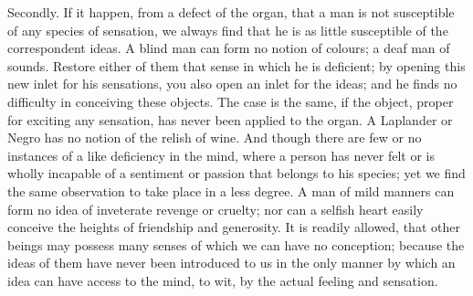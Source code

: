 \documentclass[]{article}
\begin{document}
\begin{sectionbody}
\humeparagraph  Secondly. If it happen, from a defect of the organ, that a man is not susceptible of any species of sensation, we always find that he is as little susceptible of the correspondent ideas. A blind man can form no notion of colours; a deaf man of sounds. Restore either of them that sense in which he is deficient; by opening this new inlet for his sensations, you also open an inlet for the ideas; and he finds no difficulty in conceiving these objects. The case is the same, if the object, proper for exciting any sensation, has never been applied to the organ. A Laplander or Negro has no notion of the relish of wine. And though there are few or no instances of a like deficiency in the mind, where a person has never felt or is wholly incapable of a sentiment or passion that belongs to his species; yet we find the same observation to take place in a less degree. A man of mild manners can form no idea of inveterate revenge or cruelty; nor can a selfish heart easily conceive the heights of friendship and generosity. It is readily allowed, that other beings may possess many senses of which we can have no conception; because the ideas of them have never been introduced to us in the only manner by which an idea can have access to the mind, to wit, by the actual feeling and sensation.


\end{sectionbody}
\end{document}
